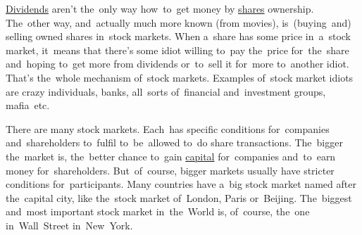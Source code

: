 \hyperref[shares]{Dividends} aren't the~only way how~to~get money by \hyperref[shares]{shares} ownership.
The~other way, and~actually much more known (from movies), is~(buying~and) selling owned shares in~stock markets.
When a~share has some price in~a~stock market, it~means that there's some idiot willing to~pay the~price for~the~share and~hoping to~get more from dividends or~to~sell it for~more to~another idiot.
That's the~whole mechanism of~stock markets.
Examples of~stock market idiots are crazy individuals, banks, all~sorts of~financial and~investment groups, mafia~etc.

There are many stock markets.
Each~has specific conditions for~companies and~shareholders to~fulfil to~be~allowed to~do share transactions.
The~bigger the~market is, the~better chance to~gain \hyperref[capital]{capital} for~companies and~to~earn money for~shareholders.
But~of~course, bigger markets usually have stricter conditions for~participants.
Many countries have a~big stock market named after the~capital city, like the~stock market of~London, Paris or~Beijing.
The~biggest and~most important stock market in~the~World is, of~course, the~one in~Wall~Street in~New~York.
\newpage

